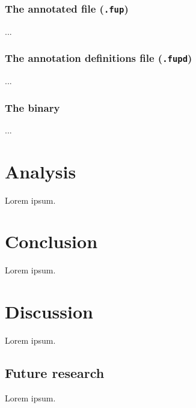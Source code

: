 \documentclass{scrreprt}
\begin{document}
\subsection{The annotated file (\texttt{.fup})}
...

\subsection{The annotation definitions file (\texttt{.fupd})}
...

\subsection{The binary}
...





\chapter{Analysis}
Lorem ipsum.





\chapter{Conclusion}
Lorem ipsum.





\chapter{Discussion}
Lorem ipsum.

\section{Future research}
Lorem ipsum.












%
%
%
%

\end{document}
